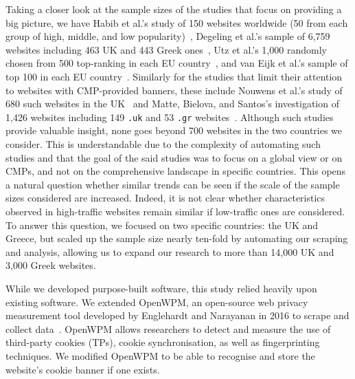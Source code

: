 Taking a closer look at the sample sizes of the studies that focus on providing a big picture, we have Habib et al.'s study of 150 websites worldwide (50 from each group of high, middle, and low popularity)~\cite{habib2019empirical}, Degeling et al.'s sample of 6,759 websites including 463 UK and 443 Greek ones~\cite{degeling2018we}, Utz et al.'s 1,000 randomly chosen from 500 top-ranking in each EU country~\cite{utz2019informed}, and van Eijk et al.'s sample of top 100 in each EU country~\cite{eijk2019impact}. 
Similarly for the studies that limit their attention to websites with CMP-provided banners, these include Nouwens et al.'s study of 680 such websites in the UK~\cite{nouwens2020dark} and Matte, Bielova, and Santos's investigation of 1,426 websites including 149 \texttt{.uk} and 53 \texttt{.gr} websites~\cite{matte2020cookie}. 
Although such studies provide valuable insight, none goes beyond 700 websites in the two countries we consider. This is understandable due to the complexity of automating such studies and that the goal of the said studies was to focus on a global view or on CMPs, and not on the comprehensive landscape in specific countries. 
This opens a natural question whether similar trends can be seen if the scale of the sample sizes considered are increased. Indeed, it is not clear whether characteristics observed in high-traffic websites remain similar if low-traffic ones are considered. 
To answer this question, we focused on two specific countries: the UK and Greece, but scaled up the sample size nearly ten-fold by automating our scraping and analysis, allowing us to expand our research to more than 14,000 UK and 3,000 Greek websites. 

While we developed purpose-built software, this study relied heavily upon existing software. We extended OpenWPM, an open-source web privacy measurement tool developed by Englehardt and Narayanan in 2016 to scrape and collect data~\cite{englehardt2016census}. OpenWPM allows researchers to detect and measure the use of third-party cookies (TPs), cookie synchronisation, as well as fingerprinting techniques. We modified OpenWPM to be able to recognise and store the website's cookie banner if one exists. 